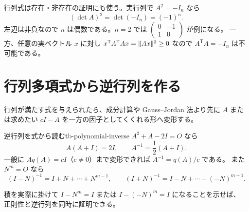 行列式は存在・非存在の証明にも使う。実行列で $A^2=-I_n$ なら
\[
(\det A)^2=\det(-I_n)=(-1)^n.
\]
左辺は非負なので $n$ は偶数である。$n=2$ では
$\begin{pmatrix}0&-1\\1&0\end{pmatrix}$ が例になる。
一方、任意の実ベクトル $x$ に対し
$x^{\mathsf T}A^{\mathsf T}Ax=\lVert Ax \rVert^2\ge0$ なので
$A^{\mathsf T}A=-I_n$ は不可能である。

\section{行列多項式から逆行列を作る}

行列が満たす式を与えられたら、成分計算や Gauss--Jordan 法より先に
$A$ または求めたい $cI-A$ を一方の因子としてくくれる形へ変形する。

\begin{proposition}{逆行列を式から読む}{tb-polynomial-inverse}
$A^2+A-2I=O$ なら
\[
A(A+I)=2I,\qquad A^{-1}=\frac12(A+I).
\]
一般に $Aq(A)=cI$（$c\ne0$）まで変形できれば $A^{-1}=q(A)/c$ である。
また $N^m=O$ なら
\[
(I-N)^{-1}=I+N+\cdots+N^{m-1},\qquad
(I+N)^{-1}=I-N+\cdots+(-N)^{m-1}.
\]
\end{proposition}

積を実際に掛けて $I-N^m=I$ または $I-(-N)^m=I$ になることを示せば、
正則性と逆行列を同時に証明できる。
